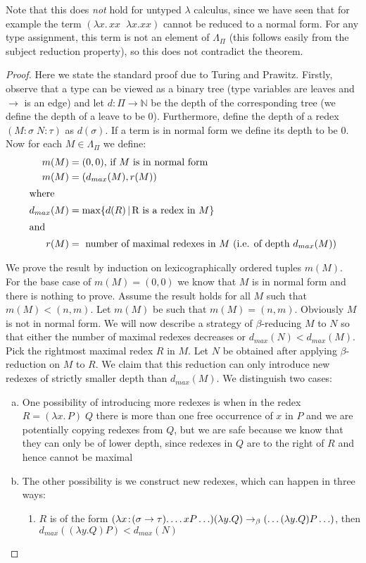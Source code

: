 Note that this does \emph{not} hold for untyped $\lambda$ calculus, since we
have seen that for example the term $(\lambda x.\, x x\;\; \lambda x. x x)$
cannot be reduced to a normal form. For any type assignment, this term is not
an element of $\Lambda_\Pi$ (this follows easily from the subject reduction
property), so this does not contradict the theorem.

\begin{proof}
    Here we state the standard proof due to Turing and Prawitz.
    Firstly, observe that a type can be viewed as a binary tree (type variables
    are leaves and $\to$ is an edge) and let $d:\Pi \to \mathbb{N}$ be the
    depth of the corresponding tree (we define the depth of a leave to be $0$).
    Furthermore, define the depth of a redex $(M\!:\!\sigma\; N\!:\!\tau)$ as
    $d(\sigma)$. If a term is in normal form we define its depth to be $0$.
    Now for each $M \in \Lambda_\Pi$ we define:
    \begin{align*}
        m(M) &= (0, 0) \text{, if $M$ is in normal form } \\
        m(M) &= (d_{max}(M), r(M)) \\
    \shortintertext{where}
        d_{max}(M) &= \max\{d(R)\, |\, \text{R is a redex in $M$}\} \\
    \shortintertext{and}
        r(M) &= \text{ number of maximal redexes in $M$ (i.e. of depth $d_{max}(M))$}
    \end{align*}

    We prove the result by induction on lexicographically ordered tuples $m(M)$.
    For the base case of $m(M) = (0, 0)$ we know that $M$ is in normal form and
    there is nothing to prove.
    Assume the result holds for all $M$ such that $m(M) < (n, m)$. Let $m(M)$
    be such that $m(M) = (n, m)$. Obviously $M$ is not in normal form. We will
    now describe a strategy of $\beta$-reducing $M$ to $N$ so that either the
    number of maximal redexes decreases or $d_{max}(N) < d_{max}(M)$. Pick the
    rightmost maximal redex $R$ in $M$. Let $N$ be
    obtained after applying $\beta$-reduction on $M$ to $R$. We claim that this
    reduction can only introduce new redexes of strictly smaller depth than
    $d_{max}(M)$. We distinguish two cases:
    \begin{enumerate}[a)]
        \item One possibility of introducing more redexes is when in the
        redex $R = (\lambda x.\, P)\; Q$ there is more than one free occurrence
        of $x$ in $P$ and we are potentially copying redexes from $Q$, but we
        are safe because we know that they can only be of lower depth, since
        redexes in $Q$ are to the right of $R$ and hence cannot be maximal
        \item The other possibility is we construct new redexes, which can
        happen in three ways:
            \begin{enumerate}[1)]
                \item $R$ is of the form $(\lambda x\!:\!(\sigma\to\tau).
                    \ldots x P \ldots) (\lambda y. Q) \rightarrow_\beta
                        (\ldots (\lambda y. Q) P \ldots )$, then
                        $d_{max}((\lambda y. Q) P) < d_{max}(N)$


\end{enumerate}
\end{enumerate}
\end{proof}
